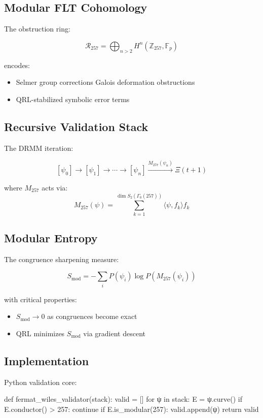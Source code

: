 \documentclass[12pt]{article}
\begin{document}
\begin{center}
\subsection{Modular FLT Cohomology}
\label{subsec:cohomology}

The obstruction ring:

\[
\mathcal{R}_{257} = \bigoplus_{n>2} H^n(\mathbb{Z}_{257}, \mathbb{F}_p)
\]

encodes:
\begin{itemize}
    \item Selmer group corrections
    \param Galois deformation obstructions
    \item QRL-stabilized symbolic error terms
\end{itemize}

\subsection{Recursive Validation Stack}
\label{subsec:stack}

The DRMM iteration:

\[
[\psi_0] \to [\psi_1] \to \cdots \to [\psi_n] \xrightarrow{M_{257}(\psi_n)} \Xi(t+1)
\]

where $M_{257}$ acts via:
\[
M_{257}(\psi) = \sum_{k=1}^{\dim S_2(\Gamma_0(257))} \langle \psi, f_k \rangle f_k
\]

\subsection{Modular Entropy}
\label{subsec:entropy}

The congruence sharpening measure:

\[
S_{\text{mod}} = -\sum_i P(\psi_i) \log P(M_{257}(\psi_i))
\]

with critical properties:
\begin{itemize}
    \item $S_{\text{mod}} \to 0$ as congruences become exact
    \item QRL minimizes $S_{\text{mod}}$ via gradient descent
\end{itemize}

\subsection{Implementation}
\label{subsec:implementation}

Python validation core:

\begin{python}
def fermat_wiles_validator(stack):
    valid = []
    for ψ in stack:
        E = ψ.curve()
        if E.conductor() > 257:
            continue
        if E.is_modular(257):
            valid.append(ψ)
    return valid
\end{python}


\end{center}
\end{document}
